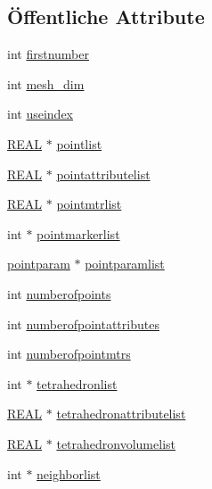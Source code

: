 \subsection*{Öffentliche Attribute}
\begin{DoxyCompactItemize}
\item 
int \hyperlink{classtetgenio_ace3ae3f90741f8e51e02f5007d81e440}{firstnumber}
\item 
int \hyperlink{classtetgenio_a79a469ad1e88f5830d2fcefe9a8ca53f}{mesh\-\_\-dim}
\item 
int \hyperlink{classtetgenio_ae95528b3d4525a3584dd26cadb8035ad}{useindex}
\item 
\hyperlink{tetgen_8h_a4b654506f18b8bfd61ad2a29a7e38c25}{R\-E\-A\-L} $\ast$ \hyperlink{classtetgenio_a69b1e0f645f57281d838569c2bbc5789}{pointlist}
\item 
\hyperlink{tetgen_8h_a4b654506f18b8bfd61ad2a29a7e38c25}{R\-E\-A\-L} $\ast$ \hyperlink{classtetgenio_a4273b235ec6260723bae849c3184ae6f}{pointattributelist}
\item 
\hyperlink{tetgen_8h_a4b654506f18b8bfd61ad2a29a7e38c25}{R\-E\-A\-L} $\ast$ \hyperlink{classtetgenio_adc248b0a839167ad5389711798613114}{pointmtrlist}
\item 
int $\ast$ \hyperlink{classtetgenio_afc154d429cb5344b1ea12318b094a2c8}{pointmarkerlist}
\item 
\hyperlink{structtetgenio_1_1pointparam}{pointparam} $\ast$ \hyperlink{classtetgenio_ab7bc1e01d32b9c2f9537ccecac5a4a04}{pointparamlist}
\item 
int \hyperlink{classtetgenio_a5211bec795ba870c01fadade4cd8670f}{numberofpoints}
\item 
int \hyperlink{classtetgenio_a3d263e577de1fa81296abe9a6ba029b0}{numberofpointattributes}
\item 
int \hyperlink{classtetgenio_a1a62cf8c03758eb3e1920c6c506c1a64}{numberofpointmtrs}
\item 
int $\ast$ \hyperlink{classtetgenio_ae53a07184487b2635d0f332ff818d938}{tetrahedronlist}
\item 
\hyperlink{tetgen_8h_a4b654506f18b8bfd61ad2a29a7e38c25}{R\-E\-A\-L} $\ast$ \hyperlink{classtetgenio_aeae735f4584f63311f1c9d46530eefe1}{tetrahedronattributelist}
\item 
\hyperlink{tetgen_8h_a4b654506f18b8bfd61ad2a29a7e38c25}{R\-E\-A\-L} $\ast$ \hyperlink{classtetgenio_a1fe58bef7f029f7b84a8541851547382}{tetrahedronvolumelist}
\item 
int $\ast$ \hyperlink{classtetgenio_ab79a85fdffb1ab3f93ff3645fb604d40}{neighborlist}

\end{DoxyCompactItemize}
